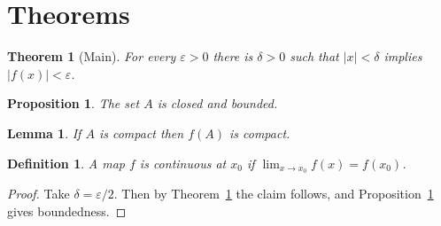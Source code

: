 \documentclass{article}
\newtheorem{theorem}{Theorem}
\newtheorem{proposition}{Proposition}
\newtheorem{lemma}{Lemma}
\newtheorem{definition}{Definition}
\begin{document}
\section{Theorems}

\begin{theorem}[Main]
For every $\varepsilon > 0$ there is $\delta > 0$ such that $|x| < \delta$
implies $|f(x)| < \varepsilon$.
\label{thm:main}
\end{theorem}

\begin{proposition}
The set $A$ is closed and bounded.
\label{prop:one}
\end{proposition}

\begin{lemma}
If $A$ is compact then $f(A)$ is compact.
\end{lemma}

\begin{definition}
A map $f$ is continuous at $x_{0}$ if $\lim_{x \to x_{0}} f(x) = f(x_{0})$.
\end{definition}

\begin{proof}
Take $\delta = \varepsilon/2$. Then by Theorem~\ref{thm:main} the claim
follows, and Proposition~\ref{prop:one} gives boundedness.
\end{proof}
\end{document}

